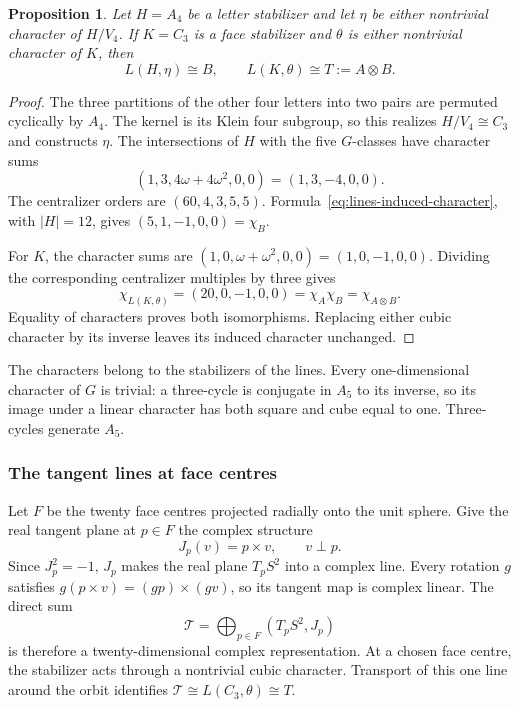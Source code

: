 \documentclass[11pt,a4paper]{article}
\newtheorem{proposition}{Proposition}[section]
\begin{document}
\begin{proposition}\label{prop:lines-inductions}
Let $H=A_4$ be a letter stabilizer and let $\eta$ be either nontrivial
character of $H/V_4$. If $K=C_3$ is a face stabilizer and $\theta$ is
either nontrivial character of $K$, then
\[
L(H,\eta)\cong B,\qquad L(K,\theta)\cong T:=A\otimes B.
\]
\end{proposition}

\begin{proof}
The three partitions of the other four letters into two pairs are
permuted cyclically by $A_4$. The kernel is its Klein four subgroup,
so this realizes $H/V_4\cong C_3$ and constructs $\eta$.
The intersections of $H$ with the five $G$-classes have character sums
\[
(1,3,4\omega+4\omega^2,0,0)=(1,3,-4,0,0).
\]
The centralizer orders are $(60,4,3,5,5)$.
Formula~\eqref{eq:lines-induced-character}, with $|H|=12$, gives
$(5,1,-1,0,0)=\chi_B$.

For $K$, the character sums are
$(1,0,\omega+\omega^2,0,0)=(1,0,-1,0,0)$.
Dividing the corresponding centralizer multiples by three gives
\[
\chi_{L(K,\theta)}=(20,0,-1,0,0)
=\chi_A\chi_B=\chi_{A\otimes B}.
\]
Equality of characters proves both isomorphisms. Replacing either
cubic character by its inverse leaves its induced character unchanged.
\end{proof}

The characters belong to the stabilizers of the lines. Every one-dimensional character of $G$ is trivial: a three-cycle is conjugate in
$A_5$ to its inverse, so its image under a linear character has both
square and cube equal to one. Three-cycles generate $A_5$.

\subsubsection*{The tangent lines at face centres}

Let $F$ be the twenty face centres projected radially onto the unit
sphere. Give the real tangent plane at $p\in F$ the complex structure
\[
J_p(v)=p\times v,\qquad v\perp p.
\]
Since $J_p^2=-1$, $J_p$ makes the real plane $T_pS^2$ into a complex line. Every rotation $g$ satisfies
$g(p\times v)=(gp)\times(gv)$, so its tangent map is complex linear.
The direct sum
\[
\mathcal T=\bigoplus_{p\in F}(T_pS^2,J_p)
\]
is therefore a twenty-dimensional complex representation. At a chosen
face centre, the stabilizer acts through a nontrivial cubic character.
Transport of this one line around the orbit identifies
$\mathcal T\cong L(C_3,\theta)\cong T$.
\end{document}
